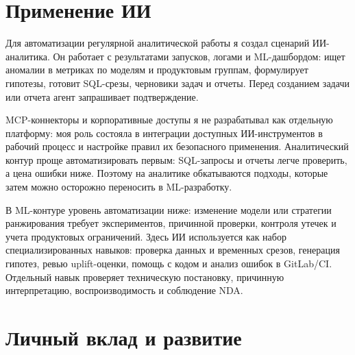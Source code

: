 \documentclass[11pt,a4paper]{article}
\begin{document}
\begin{center}
\begin{minipage}{\linewidth}
{
}
\end{minipage}
\end{center}

\section{Применение ИИ}

Для автоматизации регулярной аналитической работы я создал сценарий ИИ-аналитика. Он работает с результатами запусков, логами и ML-дашбордом: ищет аномалии в метриках по моделям и продуктовым группам, формулирует гипотезы, готовит SQL-срезы, черновики задач и отчеты. Перед созданием задачи или отчета агент запрашивает подтверждение.

MCP-коннекторы и корпоративные доступы я не разрабатывал как отдельную платформу: моя роль состояла в интеграции доступных ИИ-инструментов в рабочий процесс и настройке правил их безопасного применения. Аналитический контур проще автоматизировать первым: SQL-запросы и отчеты легче проверить, а цена ошибки ниже. Поэтому на аналитике обкатываются подходы, которые затем можно осторожно переносить в ML-разработку.

В ML-контуре уровень автоматизации ниже: изменение модели или стратегии ранжирования требует экспериментов, причинной проверки, контроля утечек и учета продуктовых ограничений. Здесь ИИ используется как набор специализированных навыков: проверка данных и временных срезов, генерация гипотез, ревью uplift-оценки, помощь с кодом и анализ ошибок в GitLab/CI. Отдельный навык проверяет техническую постановку, причинную интерпретацию, воспроизводимость и соблюдение NDA.

\section{Личный вклад и развитие}
\end{document}
